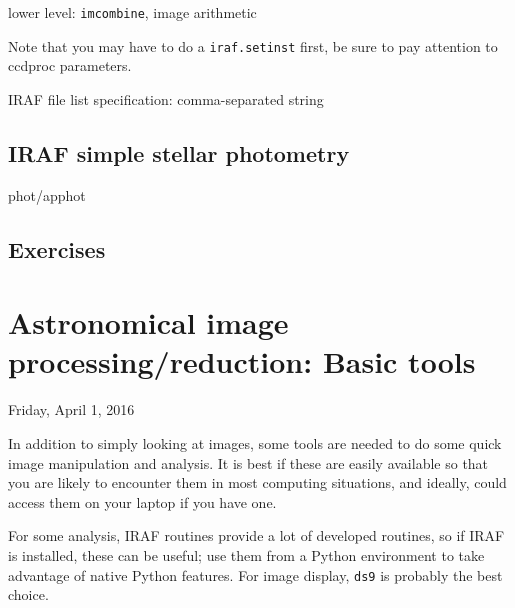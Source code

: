 \documentclass{article}
\begin{document}
lower level: \verb|imcombine|, image arithmetic

Note that you may have to do a \verb|iraf.setinst| first,
be sure to pay attention to ccdproc parameters.

IRAF file list specification: comma-separated string
\subsection*{IRAF simple stellar photometry}
phot/apphot
\subsection*{Exercises}
\newpage
\section{Astronomical image processing/reduction: Basic tools}
\textcolor{date}{Friday, April 1, 2016}

In addition to simply looking at images,
some tools are needed to do some quick image manipulation and analysis.
It is best if these are easily
available so that you are likely to encounter them in most computing
situations, and ideally, could access them on your laptop if you have
one.

For some analysis, IRAF routines provide a lot of
developed routines, so if IRAF is installed, these can be useful;
use them from a Python environment to take advantage of native Python features.
For image display, \verb|ds9| is probably the best choice.
\end{document}
